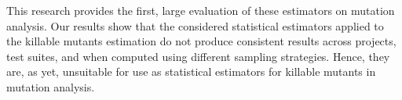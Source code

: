 \documentclass[sigconf,review,anonymous]{acmart}
\newcommand{\estimatorCount}{twelve\xspace}
\newcounter{todocounter}
\newcommand{\todo}[1]{\marginpar{$|$}\textcolor{red}{\stepcounter{todocounter}\footnote[\thetodocounter]{\textcolor{red}{\textbf{TODO }}\textit{#1}}}}
\renewcommand{\todo}[1]{}
\begin{document}
This research provides the first, large evaluation of these estimators on mutation analysis. 
%
Our results show that the considered statistical estimators %
applied to the killable mutants estimation do not produce consistent results across
projects, test suites, and when computed using different sampling strategies.
Hence, they are, as yet, unsuitable for use as statistical estimators for
killable mutants in mutation analysis.
\end{document}
